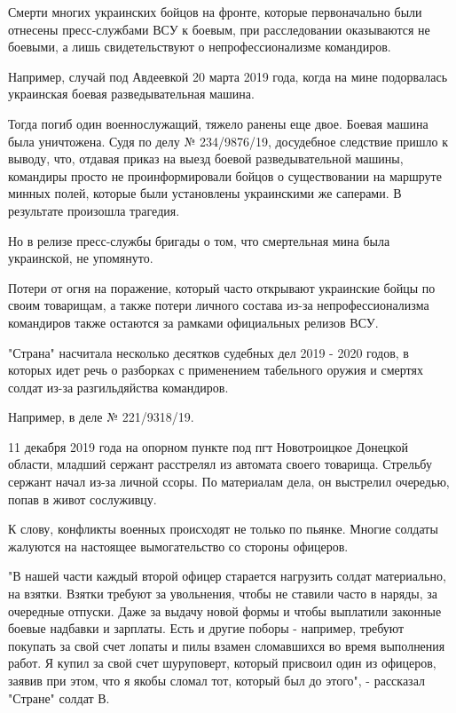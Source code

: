 Смерти многих украинских бойцов на фронте, которые первоначально были отнесены
пресс-службами ВСУ к боевым, при расследовании оказываются не боевыми, а лишь
свидетельствуют о непрофессионализме командиров.

Например, случай под Авдеевкой 20 марта 2019 года, когда на мине подорвалась
украинская боевая разведывательная машина.

Тогда погиб один военнослужащий, тяжело ранены еще двое. Боевая машина была
уничтожена. Судя по делу № 234/9876/19, досудебное следствие пришло к выводу,
что, отдавая приказ на выезд боевой разведывательной машины, командиры просто
не проинформировали бойцов о существовании на маршруте минных полей, которые
были установлены украинскими же саперами. В результате произошла трагедия.

Но в релизе пресс-службы бригады о том, что смертельная мина была украинской,
не упомянуто.

Потери от огня на поражение, который часто открывают украинские бойцы по своим
товарищам, а также потери личного состава из-за непрофессионализма командиров
также остаются за рамками официальных релизов ВСУ.

"Страна" насчитала несколько десятков судебных дел 2019 - 2020 годов, в которых
идет речь о разборках с применением табельного оружия и смертях солдат из-за
разгильдяйства командиров.

Например, в деле № 221/9318/19.

11 декабря 2019 года на опорном пункте под пгт Новотроицкое Донецкой области,
младший сержант расстрелял из автомата своего товарища. Стрельбу сержант начал
из-за личной ссоры. По материалам дела, он выстрелил очередью, попав в живот
сослуживцу.

К слову, конфликты военных происходят не только по пьянке. Многие солдаты
жалуются на настоящее вымогательство со стороны офицеров.

"В нашей части каждый второй офицер старается нагрузить солдат материально, на
взятки. Взятки требуют за увольнения, чтобы не ставили часто в наряды, за
очередные отпуски. Даже за выдачу новой формы и чтобы выплатили законные боевые
надбавки и зарплаты. Есть и другие поборы - например, требуют покупать за свой
счет лопаты и пилы взамен сломавшихся во время выполнения работ. Я купил за
свой счет шуруповерт, который присвоил один из офицеров, заявив при этом, что я
якобы сломал тот, который был до этого", - рассказал "Стране" солдат В.

